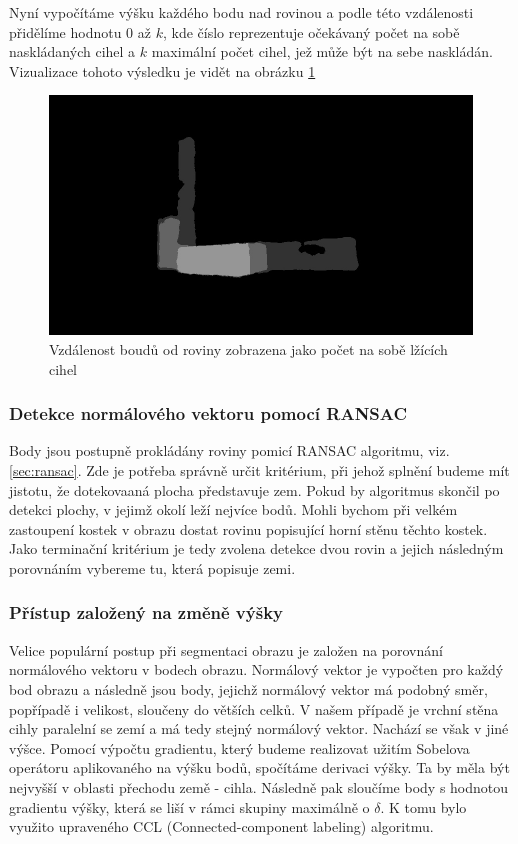 \documentclass[twoside]{ctuthesis}
\begin{document}
Nyní vypočítáme výšku každého bodu nad rovinou a podle této vzdálenosti přidělíme hodnotu 0 až $k$, kde číslo reprezentuje očekávaný počet na sobě naskládaných cihel a $k$ maximální počet cihel, jež může být na sebe naskládán. Vizualizace tohoto výsledku je vidět na obrázku \ref{fig:height_map}

\begin{figure}
    \centering
    \includegraphics[width = \linewidth]{pictures/original_vrstva2_pic1.jpg}
    \caption{Vzdálenost boudů od roviny zobrazena jako počet na sobě lžících cihel}
    \label{fig:height_map}
\end{figure}

\subsubsection{Detekce normálového vektoru pomocí RANSAC}
Body jsou postupně prokládány roviny pomicí RANSAC algoritmu, viz. \ref{sec:ransac}. Zde je potřeba správně určit kritérium, při jehož splnění budeme mít jistotu, že dotekovaaná plocha představuje zem. Pokud by algoritmus skončil po detekci plochy, v jejimž okolí leží nejvíce bodů. Mohli bychom při velkém zastoupení kostek v obrazu dostat rovinu popisující horní stěnu těchto kostek. Jako terminační kritérium je tedy zvolena detekce dvou rovin a jejich následným porovnáním vybereme tu, která popisuje zemi.

\subsubsection{Přístup založený na změně výšky}
Velice populární postup při segmentaci obrazu je založen na porovnání normálového vektoru v bodech obrazu. Normálový vektor je vypočten pro každý bod obrazu a následně jsou body, jejichž normálový vektor má podobný směr, popřípadě i velikost, sloučeny do větších celků. V našem případě je vrchní stěna cihly paralelní se zemí a má tedy stejný normálový vektor. Nachází se však v jiné výšce. Pomocí výpočtu gradientu, který budeme realizovat užitím Sobelova operátoru aplikovaného na výšku bodů, spočítáme derivaci výšky. Ta by měla být nejvyšší v oblasti přechodu země - cihla. Následně pak sloučíme body s hodnotou gradientu výšky, která se liší v rámci skupiny maximálně o $\delta$. K tomu bylo využito upraveného CCL (Connected-component labeling) algoritmu. 
\end{document}
